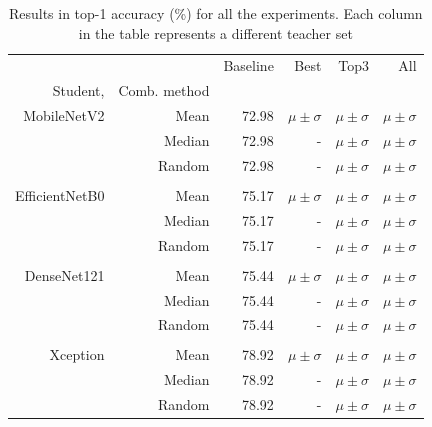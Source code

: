 \documentclass{elsarticle}
\begin{document}
	\begin{table}[h]
	\small
	\centering

	\caption{Results in top-1 accuracy (\%) for all the experiments. Each column in the table represents a different teacher set}
	\begin{tabular}{rrrrrr}\toprule
		& &Baseline &Best &Top3 &All \\
		Student, &Comb. method & & & & \\\midrule
		MobileNetV2 &Mean &72.98 &$\mu \pm \sigma$ &$\mu \pm \sigma$ &$\mu \pm \sigma$ \\
		&Median &72.98 &- &$\mu \pm \sigma$ &$\mu \pm \sigma$ \\
		&Random &72.98 &- &$\mu \pm \sigma$ &$\mu \pm \sigma$ \\
		& & & & & \\
		EfficientNetB0 &Mean &75.17 &$\mu \pm \sigma$ &$\mu \pm \sigma$ &$\mu \pm \sigma$ \\
		&Median &75.17 &- &$\mu \pm \sigma$ &$\mu \pm \sigma$ \\
		&Random &75.17 &- &$\mu \pm \sigma$ &$\mu \pm \sigma$ \\
		& & & & & \\
		DenseNet121 &Mean &75.44 &$\mu \pm \sigma$ &$\mu \pm \sigma$ &$\mu \pm \sigma$ \\
		&Median &75.44 &- &$\mu \pm \sigma$ &$\mu \pm \sigma$ \\
		&Random &75.44 &- &$\mu \pm \sigma$ &$\mu \pm \sigma$ \\
		& & & & & \\
		Xception &Mean &78.92 &$\mu \pm \sigma$ &$\mu \pm \sigma$ &$\mu \pm \sigma$ \\
		&Median &78.92 &- &$\mu \pm \sigma$ &$\mu \pm \sigma$ \\
		&Random &78.92 &- &$\mu \pm \sigma$ &$\mu \pm \sigma$ \\
		\bottomrule
	\end{tabular}
	\label{tab:results1}
	\end{table}
\end{document}
